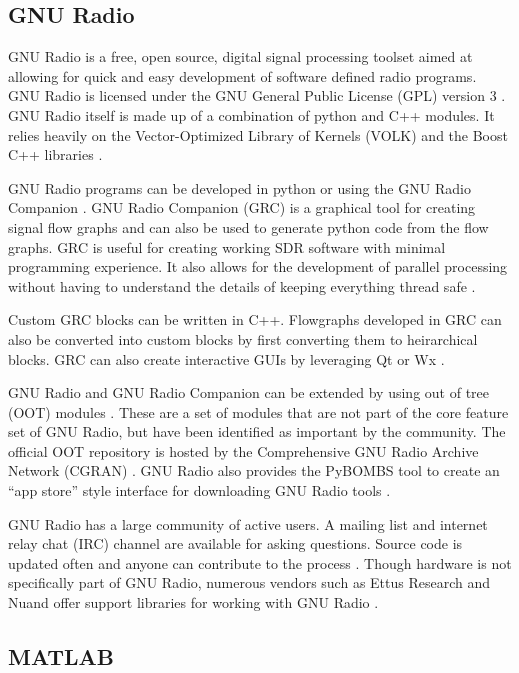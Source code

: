 \subsection{GNU Radio}

GNU Radio is a free, open source, digital signal processing toolset aimed at allowing for quick and easy development of software defined radio programs. GNU Radio is licensed under the GNU General Public License (GPL) version 3 \cite{0019}. GNU Radio itself is made up of a combination of python and C++ modules. It relies heavily on the Vector-Optimized Library of Kernels (VOLK) \cite{0021} and the Boost C++ libraries \cite{0022}. 

GNU Radio programs can be developed in python or using the GNU Radio Companion \cite{0023}. GNU Radio Companion (GRC) is a graphical tool for creating signal flow graphs and can also be used to generate python code from the flow graphs. GRC is useful for creating working SDR software with minimal programming experience. It also allows for the development of parallel processing without having to understand the details of keeping everything thread safe \cite{0023}.

Custom GRC blocks can be written in C++. Flowgraphs developed in GRC can also be converted into custom blocks by first converting them to heirarchical blocks. GRC can also create interactive GUIs by leveraging Qt or Wx \cite{0023}. 

GNU Radio and GNU Radio Companion can be extended by using out of tree (OOT) modules \cite{0024}. These are a set of modules that are not part of the core feature set of GNU Radio, but have been identified as important by the community. The official OOT repository is hosted by the Comprehensive GNU Radio Archive Network (CGRAN) \cite{0025}. GNU Radio also provides the PyBOMBS tool to create an ``app store'' style interface for downloading GNU Radio tools \cite{0024}. 

GNU Radio has a large community of active users. A mailing list and internet relay chat (IRC) channel are available for asking questions. Source code is updated often and anyone can contribute to the process \cite{0003}. Though hardware is not specifically part of GNU Radio, numerous vendors such as Ettus Research and Nuand offer support libraries for working with GNU Radio \cite{0026}. 

\subsection{MATLAB}

